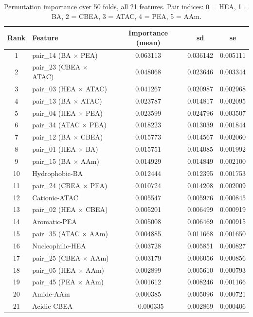 \documentclass[utf8]{frontiers_suppmat}
\begin{document}
\begin{table}[h]
\centering
\caption{Permutation importance over 50 folds, all 21 features. Pair indices: 0 = HEA, 1 = BA, 2 = CBEA, 3 = ATAC, 4 = PEA, 5 = AAm.}
\label{tab:S11}
\begin{tabular}{clccc}
\toprule
Rank & Feature & Importance (mean) & sd & se \\
\midrule
1 & pair\_14 (BA $\times$ PEA) & 0.063113 & 0.036142 & 0.005111 \\
2 & pair\_23 (CBEA $\times$ ATAC) & 0.048068 & 0.023646 & 0.003344 \\
3 & pair\_03 (HEA $\times$ ATAC) & 0.041267 & 0.020987 & 0.002968 \\
4 & pair\_13 (BA $\times$ ATAC) & 0.023787 & 0.014817 & 0.002095 \\
5 & pair\_04 (HEA $\times$ PEA) & 0.023599 & 0.024796 & 0.003507 \\
6 & pair\_34 (ATAC $\times$ PEA) & 0.018223 & 0.013039 & 0.001844 \\
7 & pair\_12 (BA $\times$ CBEA) & 0.015773 & 0.014567 & 0.002060 \\
8 & pair\_01 (HEA $\times$ BA) & 0.015751 & 0.014085 & 0.001992 \\
9 & pair\_15 (BA $\times$ AAm) & 0.014929 & 0.014849 & 0.002100 \\
10 & Hydrophobic-BA & 0.012444 & 0.012395 & 0.001753 \\
11 & pair\_24 (CBEA $\times$ PEA) & 0.010724 & 0.014208 & 0.002009 \\
12 & Cationic-ATAC & 0.005547 & 0.005976 & 0.000845 \\
13 & pair\_02 (HEA $\times$ CBEA) & 0.005201 & 0.006499 & 0.000919 \\
14 & Aromatic-PEA & 0.005008 & 0.006469 & 0.000915 \\
15 & pair\_35 (ATAC $\times$ AAm) & 0.004885 & 0.011668 & 0.001650 \\
16 & Nucleophilic-HEA & 0.003728 & 0.005851 & 0.000827 \\
17 & pair\_25 (CBEA $\times$ AAm) & 0.003179 & 0.006056 & 0.000856 \\
18 & pair\_05 (HEA $\times$ AAm) & 0.002899 & 0.005610 & 0.000793 \\
19 & pair\_45 (PEA $\times$ AAm) & 0.001612 & 0.008246 & 0.001166 \\
20 & Amide-AAm & 0.000385 & 0.005096 & 0.000721 \\
21 & Acidic-CBEA & $-0.000335$ & 0.002869 & 0.000406 \\
\bottomrule
\end{tabular}
\end{table}
\end{document}

